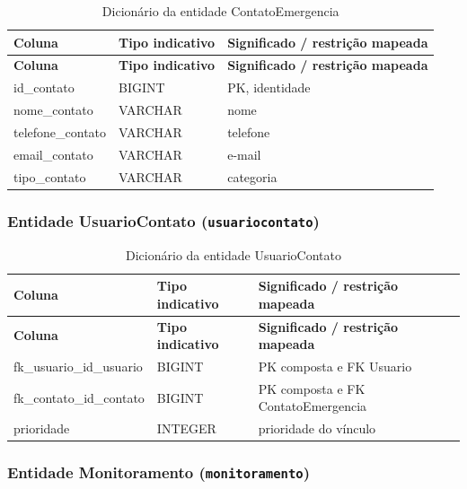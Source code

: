 \begin{longtable}{p{4.8cm}p{3.05cm}p{5.05cm}}
\caption{Dicionário da entidade ContatoEmergencia}\label{quad_contato}\\
\hline
\textbf{Coluna} & \textbf{Tipo indicativo} & \textbf{Significado / restrição mapeada} \\
\hline
\endfirsthead
\hline\textbf{Coluna} & \textbf{Tipo indicativo} & \textbf{Significado / restrição mapeada} \\
\hline
\endhead
id\_contato & BIGINT & PK, identidade \\
\hline
nome\_contato & VARCHAR & nome \\
\hline
telefone\_contato & VARCHAR & telefone \\
\hline
email\_contato & VARCHAR & e-mail \\
\hline
tipo\_contato & VARCHAR & categoria \\
\hline
\end{longtable}

\subsubsection{Entidade UsuarioContato (\texttt{usuariocontato})}

\begin{longtable}{p{4.8cm}p{3.05cm}p{5.05cm}}
\caption{Dicionário da entidade UsuarioContato}\label{quad_usuario_contato}\\
\hline
\textbf{Coluna} & \textbf{Tipo indicativo} & \textbf{Significado / restrição mapeada} \\
\hline
\endfirsthead
\hline\textbf{Coluna} & \textbf{Tipo indicativo} & \textbf{Significado / restrição mapeada} \\
\hline
\endhead
fk\_usuario\_id\_usuario & BIGINT & PK composta e FK Usuario \\
\hline
fk\_contato\_id\_contato & BIGINT & PK composta e FK ContatoEmergencia \\
\hline
prioridade & INTEGER & prioridade do vínculo \\
\hline
\end{longtable}

\subsubsection{Entidade Monitoramento (\texttt{monitoramento})}

